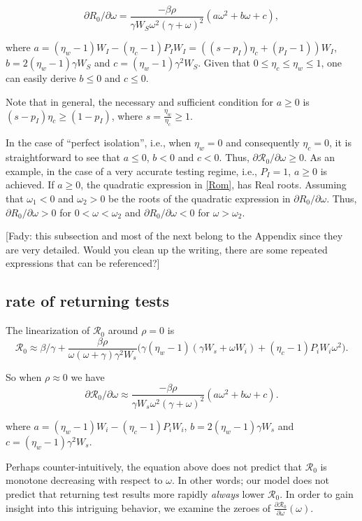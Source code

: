 \documentclass[12pt]{article}
\newcommand{\Rnum}{\mathcal{R}_0}
\theoremstyle{definition} %
\begin{document}
\begin{equation}
\label{Rom}
\partial{R_0}/\partial{\omega}=  \frac{-\beta \rho}{\gamma W_S\omega^2 (\gamma+\omega)^2}  (a \omega^2 + b \omega + c),
\end{equation}

where $a=(\eta_w-1)W_I-(\eta_c-1)P_I W_I = ((s-p_I)\eta_c + (p_I-1)) W_I$, $b=2(\eta_w-1)\gamma W_S$ and $c=(\eta_w-1)\gamma^2 W_S$.
Given that $0 \leq \eta_c\leq \eta_w \leq 1 $, one can easily derive $b\leq 0$ and $c \leq 0$. 

Note that in general, the necessary and sufficient condition for $a \geq 0$ is $(s-p_I) \eta_c \geq (1-p_I)$, where $s=\frac{\eta_w}{\eta_c} \geq 1$. 

In the case of ``perfect isolation'', i.e., when $\eta_w=0$ and consequently $\eta_c=0$, it is straightforward to see that $a \leq 0$, $b<0$ and $c<0$. Thus, $\partial{\Rnum}/\partial{\omega} \geq 0$. 
As an example, in the case of a very accurate testing regime,  i.e., $P_I=1$, $a \geq 0$ is achieved. If $a\geq 0$, the quadratic expression in \eqref{Rom}, has Real roots. Assuming that $\omega_1<0$ and $\omega_2>0$ be the roots of the quadratic expression in $\partial{R_0}/\partial{\omega}$. Thus, $\partial{R_0}/\partial{\omega}>0$ for $0<\omega<\omega_2$ and  $\partial{R_0}/\partial{\omega}<0$ for $\omega>\omega_2$.

[Fady: this subsection and most of the next belong to the Appendix since they are very detailed. Would you clean up the writing, there are some repeated expressions that can be referenced?]

\subsection{rate of returning tests}
The linearization of $\Rnum$ around $\rho=0$ is
\begin{equation}\label{linearization}
\Rnum \approx \beta/\gamma + \frac{\beta \rho}{\omega (\omega+\gamma) \gamma^2 W_s} \Big(\gamma(\eta_w-1)(\gamma W_s+\omega W_i) + (\eta_c -1)P_iW_i \omega^2 \Big). 
\end{equation}

So when $\rho \approx 0$ we have $$\partial{\Rnum}/\partial{\omega} \approx  \frac{-\beta \rho}{\gamma W_s\omega^2 (\gamma+\omega)^2}  (a \omega^2 + b \omega + c).$$

where $a=(\eta_w-1)W_i-(\eta_c-1)P_iW_i$, $b=2(\eta_w-1)\gamma W_s$ and $c=(\eta_w-1)\gamma^2 W_s$. 

Perhaps counter-intuitively, the equation above does not predict that $\Rnum$ is monotone decreasing with respect to $\omega$. In other words; our model does not predict that returning test results more rapidly \textit{always} lower $\Rnum$. In order to gain insight into this intriguing behavior, we examine the zeroes of $\frac{\partial{\Rnum}}{\partial{\omega}}(\omega)$.
\end{document}
